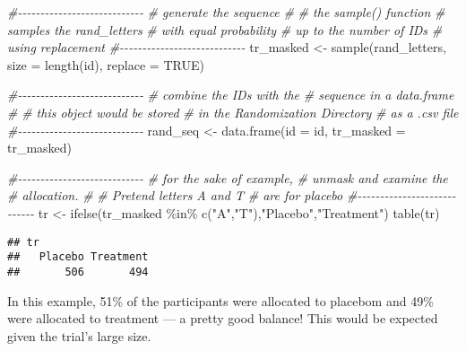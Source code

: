 \documentclass[
]{book}
\newenvironment{Shaded}{\begin{snugshade}}{\end{snugshade}}
\newcommand{\AttributeTok}[1]{\textcolor[rgb]{0.77,0.63,0.00}{#1}}
\newcommand{\CommentTok}[1]{\textcolor[rgb]{0.56,0.35,0.01}{\textit{#1}}}
\newcommand{\ConstantTok}[1]{\textcolor[rgb]{0.00,0.00,0.00}{#1}}
\newcommand{\FunctionTok}[1]{\textcolor[rgb]{0.00,0.00,0.00}{#1}}
\newcommand{\NormalTok}[1]{#1}
\newcommand{\OtherTok}[1]{\textcolor[rgb]{0.56,0.35,0.01}{#1}}
\newcommand{\SpecialCharTok}[1]{\textcolor[rgb]{0.00,0.00,0.00}{#1}}
\newcommand{\StringTok}[1]{\textcolor[rgb]{0.31,0.60,0.02}{#1}}
\begin{document}
\begin{Shaded}
\begin{Highlighting}[]
\CommentTok{\#{-}{-}{-}{-}{-}{-}{-}{-}{-}{-}{-}{-}{-}{-}{-}{-}{-}{-}{-}{-}{-}{-}{-}{-}{-}{-}{-}{-}}
\CommentTok{\# generate the sequence}
\CommentTok{\#}
\CommentTok{\# the sample() function}
\CommentTok{\# samples the rand\_letters}
\CommentTok{\# with equal probability}
\CommentTok{\# up to the number of IDs}
\CommentTok{\# using replacement}
\CommentTok{\#{-}{-}{-}{-}{-}{-}{-}{-}{-}{-}{-}{-}{-}{-}{-}{-}{-}{-}{-}{-}{-}{-}{-}{-}{-}{-}{-}{-}}
\NormalTok{tr\_masked }\OtherTok{\textless{}{-}} \FunctionTok{sample}\NormalTok{(rand\_letters, }\AttributeTok{size =} \FunctionTok{length}\NormalTok{(id), }\AttributeTok{replace =} \ConstantTok{TRUE}\NormalTok{)}

\CommentTok{\#{-}{-}{-}{-}{-}{-}{-}{-}{-}{-}{-}{-}{-}{-}{-}{-}{-}{-}{-}{-}{-}{-}{-}{-}{-}{-}{-}{-}}
\CommentTok{\# combine the IDs with the}
\CommentTok{\# sequence in a data.frame}
\CommentTok{\#}
\CommentTok{\# this object would be stored}
\CommentTok{\# in the Randomization Directory}
\CommentTok{\# as a .csv file}
\CommentTok{\#{-}{-}{-}{-}{-}{-}{-}{-}{-}{-}{-}{-}{-}{-}{-}{-}{-}{-}{-}{-}{-}{-}{-}{-}{-}{-}{-}{-}}
\NormalTok{rand\_seq }\OtherTok{\textless{}{-}} \FunctionTok{data.frame}\NormalTok{(}\AttributeTok{id =}\NormalTok{ id, }\AttributeTok{tr\_masked =}\NormalTok{ tr\_masked)}


\CommentTok{\#{-}{-}{-}{-}{-}{-}{-}{-}{-}{-}{-}{-}{-}{-}{-}{-}{-}{-}{-}{-}{-}{-}{-}{-}{-}{-}{-}{-}}
\CommentTok{\# for the sake of example,}
\CommentTok{\# unmask and examine the }
\CommentTok{\# allocation. }
\CommentTok{\#}
\CommentTok{\# Pretend letters A and T }
\CommentTok{\# are for placebo}
\CommentTok{\#{-}{-}{-}{-}{-}{-}{-}{-}{-}{-}{-}{-}{-}{-}{-}{-}{-}{-}{-}{-}{-}{-}{-}{-}{-}{-}{-}{-}}
\NormalTok{tr }\OtherTok{\textless{}{-}} \FunctionTok{ifelse}\NormalTok{(tr\_masked }\SpecialCharTok{\%in\%} \FunctionTok{c}\NormalTok{(}\StringTok{"A"}\NormalTok{,}\StringTok{"T"}\NormalTok{),}\StringTok{"Placebo"}\NormalTok{,}\StringTok{"Treatment"}\NormalTok{)}
\FunctionTok{table}\NormalTok{(tr)}
\end{Highlighting}
\end{Shaded}

\begin{verbatim}
## tr
##   Placebo Treatment 
##       506       494
\end{verbatim}

In this example, 51\% of the participants were allocated to placebom and 49\% were allocated to treatment --- a pretty good balance! This would be expected given the trial's large size.
\end{document}
